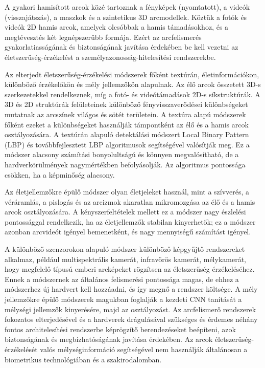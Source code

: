 A gyakori hamisított arcok közé tartoznak a fényképek (nyomtatott), a videók (visszajátszás), a maszkok és a szintetikus 3D arcmodellek. Köztük a fotók és videók 2D hamis arcok, amelyek olcsóbbak a hamis támadásokhoz, és a megtévesztés két legnépszerűbb formája. Ezért az arcfelismerés gyakorlatiasságának és biztonságának javítása érdekében be kell vezetni az életszerűség-érzékelést a személyazonosság-hitelesítési rendszerekbe. 

Az elterjedt életszerűség-érzékelési módszerek főként textúrán, életinformációkon, különböző érzékelőkön és mély jellemzőkön alapulnak. Az élő arcok összetett 3D-s szerkezetekkel rendelkeznek, míg a fotó- és videótámadások 2D-s síkstruktúrák. A 3D és 2D struktúrák felületeinek különböző fényvisszaverődései különbségeket mutatnak az arcszínek világos és sötét területein. A textúra alapú módszerek főként ezeket a különbségeket használják támpontként az élő és a hamis arcok osztályozására. A textúrán alapuló detektálási módszert Local Binary Pattern (LBP) \cite{19} és továbbfejlesztett LBP \cite{20} algoritmusok segítségével valósítják meg. Ez a módszer alacsony számítási bonyolultságú és könnyen megvalósítható, de a hardverkörülmények nagymértékben befolyásolják. Az algoritmus pontossága csökken, ha a képminőség alacsony.

Az életjellemzőkre épülő módszer olyan életjeleket használ, mint a szívverés, a véráramlás, a pislogás és az arcizmok akaratlan mikromozgása az élő és a hamis arcok osztályozására. A kényszerfeltételek mellett ez a módszer nagy észlelési pontossággal rendelkezik, ha az életjellemzők stabilan kinyerhetők; ez a módszer azonban arcvideót igényel bemenetként, és nagy mennyiségű számítást igényel.

A különböző szenzorokon alapuló módszer különböző képgyűjtő rendszereket alkalmaz, például multispektrális kamerát, infravörös kamerát, mélykamerát, hogy megfelelő típusú emberi arcképeket rögzítsen az életszerűség érzékeléséhez. Ennek a módszernek az általános felismerési pontossága magas, de ehhez a módszerhez új hardvert kell hozzáadni, és így megnő a rendszer költsége. A mély jellemzőkre épülő módszerek magukban foglalják a kezdeti CNN tanítását a mélységi jellemzők kinyerésére, majd az osztályozást. Az arcfelismerő rendszerek fokozatos elterjedésével és a hardverek drágulásával szükséges és érdemes néhány fontos architelesítési rendszerbe képrögzítő berendezéseket beépíteni, azok biztonságának és megbízhatóságának javítása érdekében. Az arcok életszerűség-érzékelését valós mélységinformáció segítségével nem használják általánosan a biometrikus technológiában és a szakirodalomban.


